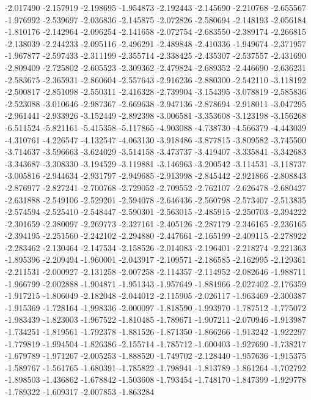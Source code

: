 -2.017490
-2.157919
-2.198695
-1.954873
-2.192443
-2.145690
-2.210768
-2.655567
-1.976992
-2.539697
-2.036836
-2.145875
-2.072826
-2.580694
-2.148193
-2.056184
-1.810176
-2.142964
-2.096254
-2.141658
-2.072754
-2.683550
-2.389174
-2.266815
-2.138039
-2.244233
-2.095116
-2.496291
-2.489848
-2.410336
-1.949674
-2.371957
-1.967877
-2.597433
-2.311199
-2.355714
-2.338425
-2.435307
-2.537557
-2.431690
-2.809409
-2.725802
-2.605523
-2.309362
-2.479824
-2.689352
-2.446690
-2.636231
-2.583675
-2.365931
-2.860604
-2.557643
-2.916236
-2.880300
-2.542110
-3.118192
-2.500817
-2.851098
-2.550311
-2.416328
-2.739904
-3.154395
-3.078819
-2.585836
-2.523088
-3.010646
-2.987367
-2.669638
-2.947136
-2.878694
-2.918011
-3.047295
-2.961441
-2.933926
-3.152449
-2.892398
-3.006581
-3.353608
-3.123198
-3.156268
-6.511524
-5.821161
-5.415358
-5.117865
-4.903088
-4.738730
-4.566379
-4.443039
-4.310761
-4.226547
-4.132547
-4.063130
-3.918486
-3.877815
-3.809582
-3.745500
-3.714637
-3.596663
-3.624029
-3.514158
-3.473737
-3.419407
-3.335841
-3.342683
-3.343687
-3.308330
-3.194529
-3.119881
-3.146963
-3.200542
-3.114531
-3.118737
-3.005816
-2.944634
-2.931797
-2.949685
-2.913998
-2.845442
-2.921866
-2.808843
-2.876977
-2.827241
-2.700768
-2.729052
-2.709552
-2.762107
-2.626478
-2.680427
-2.631888
-2.549106
-2.529201
-2.594078
-2.646436
-2.560798
-2.573407
-2.513835
-2.574594
-2.525410
-2.548447
-2.590301
-2.563015
-2.485915
-2.250703
-2.394222
-2.301659
-2.380097
-2.269773
-2.327161
-2.405126
-2.287179
-2.346165
-2.236165
-2.394195
-2.251560
-2.242102
-2.294880
-2.447661
-2.165199
-2.409115
-2.278922
-2.283462
-2.130464
-2.147534
-2.158526
-2.014083
-2.196401
-2.218274
-2.221363
-1.895396
-2.209494
-1.960001
-2.043917
-2.109571
-2.186585
-2.162995
-2.129361
-2.211531
-2.000927
-2.131258
-2.007258
-2.114357
-2.114952
-2.082646
-1.988711
-1.966799
-2.002888
-1.904871
-1.951343
-1.957649
-1.881966
-2.027402
-2.176359
-1.917215
-1.806049
-2.182048
-2.044012
-2.115905
-2.026117
-1.963469
-2.300387
-1.915369
-1.728164
-1.998336
-2.000097
-1.818590
-1.993970
-1.787512
-1.775072
-1.983439
-1.823003
-1.967522
-1.810485
-1.789671
-1.907211
-2.070946
-1.913987
-1.734251
-1.819561
-1.792378
-1.881526
-1.871350
-1.866266
-1.913242
-1.922297
-1.779819
-1.994504
-1.826386
-2.155714
-1.785712
-1.600403
-1.927690
-1.738217
-1.679789
-1.971267
-2.005253
-1.888520
-1.749702
-2.128440
-1.957636
-1.915375
-1.589767
-1.561765
-1.680391
-1.785822
-1.798941
-1.813789
-1.861264
-1.702792
-1.898503
-1.436862
-1.678842
-1.503608
-1.793454
-1.748170
-1.847399
-1.929778
-1.789322
-1.609317
-2.007853
-1.863284
